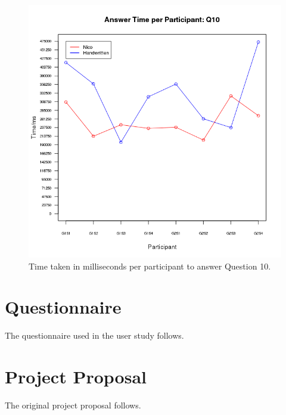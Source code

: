 \documentclass[12pt,twoside,notitlepage,xetex]{report}
\begin{document}
\begin{center}
\begin{figure}[H]
\begin{center}
\includegraphics[height=\textheight/2-2cm]{figs/graphs/q10.png}
\end{center}
\caption{Time taken in milliseconds per participant to answer Question 10.}
\end{figure}
\end{center}

\chapter{Questionnaire}

The questionnaire used in the user study follows.



\cleardoublepage

\chapter{Project Proposal}

The original project proposal follows.


% 
\end{document}
